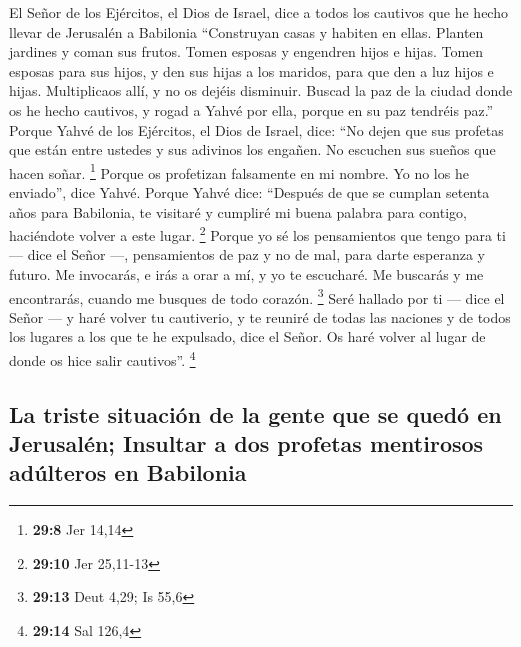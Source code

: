  El Señor de los Ejércitos, el Dios de Israel, dice a
todos los cautivos que he hecho llevar de Jerusalén a Babilonia
 ``Construyan casas y habiten en ellas. Planten jardines y
coman sus frutos.  Tomen esposas y engendren hijos e
hijas. Tomen esposas para sus hijos, y den sus hijas a los maridos, para
que den a luz hijos e hijas. Multiplicaos allí, y no os dejéis
disminuir.  Buscad la paz de la ciudad donde os he hecho
cautivos, y rogad a Yahvé por ella, porque en su paz tendréis paz.''
 Porque Yahvé de los Ejércitos, el Dios de Israel, dice:
``No dejen que sus profetas que están entre ustedes y sus adivinos los
engañen. No escuchen sus sueños que hacen soñar. \footnote{\textbf{29:8}
  Jer 14,14}  Porque os profetizan falsamente en mi
nombre. Yo no los he enviado'', dice Yahvé.  Porque Yahvé
dice: ``Después de que se cumplan setenta años para Babilonia, te
visitaré y cumpliré mi buena palabra para contigo, haciéndote volver a
este lugar. \footnote{\textbf{29:10} Jer 25,11-13} 
Porque yo sé los pensamientos que tengo para ti --- dice el Señor ---,
pensamientos de paz y no de mal, para darte esperanza y futuro.
 Me invocarás, e irás a orar a mí, y yo te escucharé.
 Me buscarás y me encontrarás, cuando me busques de todo
corazón. \footnote{\textbf{29:13} Deut 4,29; Is 55,6} 
Seré hallado por ti --- dice el Señor --- y haré volver tu cautiverio, y
te reuniré de todas las naciones y de todos los lugares a los que te he
expulsado, dice el Señor. Os haré volver al lugar de donde os hice salir
cautivos''. \footnote{\textbf{29:14} Sal 126,4}

\hypertarget{la-triste-situaciuxf3n-de-la-gente-que-se-queduxf3-en-jerusaluxe9n-insultar-a-dos-profetas-mentirosos-aduxfalteros-en-babilonia}{%
\subsection{La triste situación de la gente que se quedó en Jerusalén;
Insultar a dos profetas mentirosos adúlteros en
Babilonia}\label{la-triste-situaciuxf3n-de-la-gente-que-se-queduxf3-en-jerusaluxe9n-insultar-a-dos-profetas-mentirosos-aduxfalteros-en-babilonia}}

